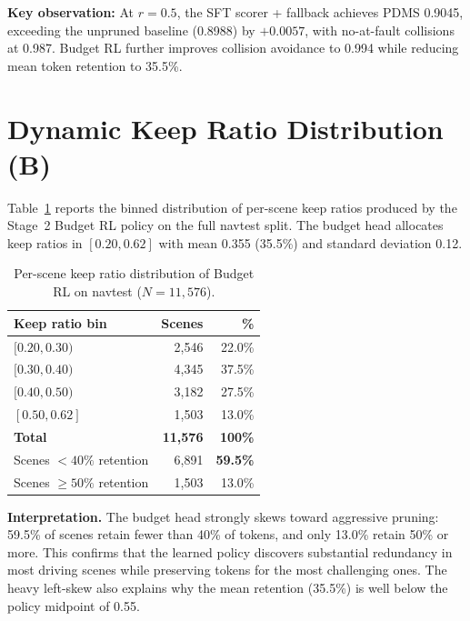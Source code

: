 \documentclass[letterpaper]{article}
\begin{document}
\textbf{Key observation:} At $r{=}0.5$, the SFT scorer + fallback achieves PDMS 0.9045, exceeding
the unpruned baseline (0.8988) by $+0.0057$, with no-at-fault collisions at 0.987. Budget RL
further improves collision avoidance to 0.994 while reducing mean token retention to 35.5\%.

\section{Dynamic Keep Ratio Distribution (B)}
\label{sec:distribution}

Table~\ref{tab:binned} reports the binned distribution of per-scene keep ratios produced by the
Stage~2 Budget RL policy on the full navtest split. The budget head allocates keep ratios in
$[0.20, 0.62]$ with mean 0.355 (35.5\%) and standard deviation 0.12.

\begin{table}[h]
\centering
\caption{Per-scene keep ratio distribution of Budget RL on navtest ($N{=}11{,}576$).}
\label{tab:binned}
\begin{tabular}{@{}lrr@{}}
\toprule
Keep ratio bin & Scenes & \% \\
\midrule
$[0.20, 0.30)$ & 2{,}546 & 22.0\% \\
$[0.30, 0.40)$ & 4{,}345 & 37.5\% \\
$[0.40, 0.50)$ & 3{,}182 & 27.5\% \\
$[0.50, 0.62]$ & 1{,}503 & 13.0\% \\
\midrule
\textbf{Total} & \textbf{11{,}576} & \textbf{100\%} \\
\midrule
Scenes $<40\%$ retention & 6{,}891 & \textbf{59.5\%} \\
Scenes $\geq 50\%$ retention & 1{,}503 & 13.0\% \\
\bottomrule
\end{tabular}
\end{table}

\textbf{Interpretation.} The budget head strongly skews toward aggressive pruning: 59.5\% of scenes
retain fewer than 40\% of tokens, and only 13.0\% retain 50\% or more. This confirms that the
learned policy discovers substantial redundancy in most driving scenes while preserving tokens for
the most challenging ones. The heavy left-skew also explains why the mean retention (35.5\%) is well
below the policy midpoint of 0.55.
\end{document}
